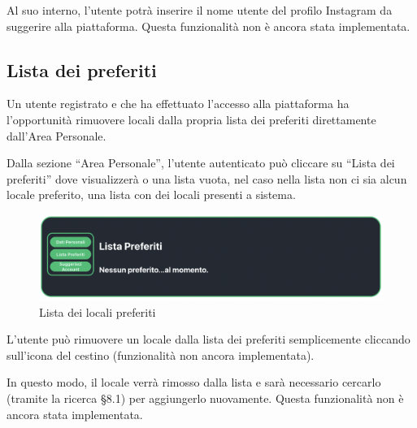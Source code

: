 Al suo interno, l’utente potrà inserire il nome utente del profilo Instagram da suggerire alla piattaforma. Questa funzionalità non è ancora stata implementata.

\subsection{Lista dei preferiti}

Un utente registrato e che ha effettuato l’accesso alla piattaforma ha l’opportunità rimuovere locali dalla propria lista dei preferiti direttamente dall'Area Personale.

Dalla sezione “Area Personale”, l’utente autenticato può cliccare su “Lista dei preferiti” dove visualizzerà o una lista vuota, nel caso nella lista non ci sia alcun locale preferito, una lista con dei locali presenti a sistema.

\begin{figure}[H]
\centering
\includegraphics[scale=0.4]{./images/AreaPersonale/ListaPreferiti.png} 
\caption{Lista dei locali preferiti}
\end{figure}

L’utente può rimuovere un locale dalla lista dei preferiti semplicemente cliccando sull’icona del cestino (funzionalità non ancora implementata).

In questo modo, il locale verrà rimosso dalla lista e sarà necessario cercarlo (tramite la ricerca \S{8.1}) per aggiungerlo nuovamente. Questa funzionalità non è ancora stata implementata.
